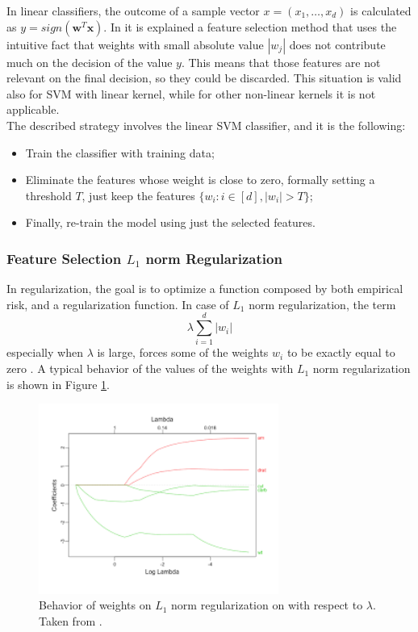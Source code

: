 In linear classifiers, the outcome of a sample vector $x = (x_1, \dots, x_d)$ is calculated as $y=sign(\mathbf{w}^T\mathbf{x})$. In \cite{Brank2002FeatureSU} it is explained a feature selection method that uses the intuitive fact that weights with small absolute value $|w_j|$ does not contribute much on the decision of the value $y$. This means that those features are not relevant on the final decision, so they could be discarded. This situation is valid also for SVM with linear kernel, while for other non-linear kernels it is not applicable.\\
The described strategy involves the linear \ac{SVM} classifier, and it is the following:
\begin{itemize}
	\item Train the classifier with training data;
	\item Eliminate the features whose weight is close to zero, formally setting a threshold $T$, just keep the features $\{w_i : i \in [d], |w_i| > T\}$;
	\item Finally, re-train the model using just the selected features.
\end{itemize}

\subsubsection{Feature Selection $L_1$ norm Regularization}

In regularization, the goal is to optimize a function composed by both empirical risk, and a regularization function. In case of $L_1$ norm regularization, the term
\[ \lambda \sum_{i = 1}^{d} |w_i| \]
especially when $\lambda$ is large, forces some of the weights $w_i$ to be exactly equal to zero \cite{article-lasso}. A typical behavior of the values of the weights with $L_1$ norm regularization is shown in Figure \ref{fig:lasso}.


\begin{figure}[ht]
	\centering
	\includegraphics[width=0.7\textwidth]{figures/lasso.png}
	\caption{Behavior of weights on $L_1$ norm regularization on with respect to $\lambda$. Taken from \cite{Fonti2017PaperIB}.}
	\label{fig:lasso}
\end{figure}

